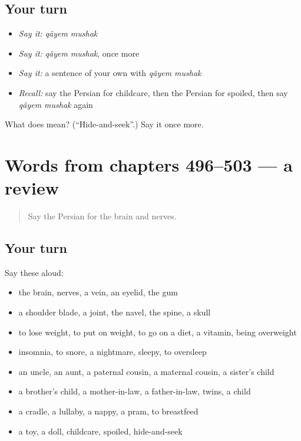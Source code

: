 \subsection*{Your turn}
\begin{itemize}
\raggedright
  \item \emph{Say it:} \emph{qâyem mushak}
  \item \emph{Say it:} \emph{qâyem mushak}, once more
  \item \emph{Say it:} a sentence of your own with \emph{qâyem mushak}
  \item \emph{Recall:} say the Persian for childcare, then the Persian for spoiled, then say \emph{qâyem mushak} again
\end{itemize}

\begin{tcolorbox}[breakable,colback=teal!4,colframe=teal!35!black,title={Before you move on}]
What does   mean? (\textquotedblleft{}Hide-and-seek\textquotedblright{}.) Say it once more.
\end{tcolorbox}
\section[(dialogue)]{Words from chapters 496–503 — a review}

\label{lesson:FA-R503-review-496-503}



\begin{quote}
Say the Persian for the brain and nerves.
\end{quote}

\subsection*{Your turn}
Say these aloud:

\begin{itemize}
\raggedright
  \item the brain, nerves, a vein, an eyelid, the gum
  \item a shoulder blade, a joint, the navel, the spine, a skull
  \item to lose weight, to put on weight, to go on a diet, a vitamin, being overweight
  \item insomnia, to snore, a nightmare, sleepy, to oversleep
  \item an uncle, an aunt, a paternal cousin, a maternal cousin, a sister's child
  \item a brother's child, a mother-in-law, a father-in-law, twins, a child
  \item a cradle, a lullaby, a nappy, a pram, to breastfeed
  \item a toy, a doll, childcare, spoiled, hide-and-seek
\end{itemize}

